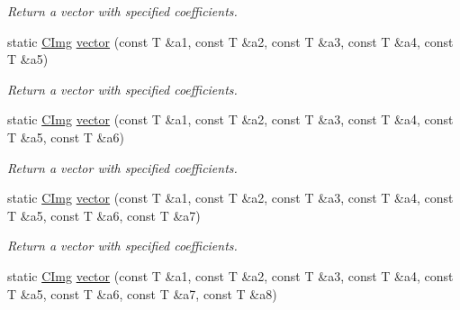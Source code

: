 \begin{DoxyCompactItemize}
\begin{DoxyCompactList}\small\item\em Return a vector with specified coefficients. \item\end{DoxyCompactList}\item 
\hypertarget{structcimg__library_1_1_c_img_a7c57e2bfa997e03cf87ac2e8a39e5534}{
static \hyperlink{structcimg__library_1_1_c_img}{CImg} \hyperlink{structcimg__library_1_1_c_img_a7c57e2bfa997e03cf87ac2e8a39e5534}{vector} (const T \&a1, const T \&a2, const T \&a3, const T \&a4, const T \&a5)}
\label{structcimg__library_1_1_c_img_a7c57e2bfa997e03cf87ac2e8a39e5534}

\begin{DoxyCompactList}\small\item\em Return a vector with specified coefficients. \item\end{DoxyCompactList}\item 
\hypertarget{structcimg__library_1_1_c_img_a18472c0200e352d112a9acf746cdbbf5}{
static \hyperlink{structcimg__library_1_1_c_img}{CImg} \hyperlink{structcimg__library_1_1_c_img_a18472c0200e352d112a9acf746cdbbf5}{vector} (const T \&a1, const T \&a2, const T \&a3, const T \&a4, const T \&a5, const T \&a6)}
\label{structcimg__library_1_1_c_img_a18472c0200e352d112a9acf746cdbbf5}

\begin{DoxyCompactList}\small\item\em Return a vector with specified coefficients. \item\end{DoxyCompactList}\item 
\hypertarget{structcimg__library_1_1_c_img_a8104cd331d7ee1f65e85dc12074a42fd}{
static \hyperlink{structcimg__library_1_1_c_img}{CImg} \hyperlink{structcimg__library_1_1_c_img_a8104cd331d7ee1f65e85dc12074a42fd}{vector} (const T \&a1, const T \&a2, const T \&a3, const T \&a4, const T \&a5, const T \&a6, const T \&a7)}
\label{structcimg__library_1_1_c_img_a8104cd331d7ee1f65e85dc12074a42fd}

\begin{DoxyCompactList}\small\item\em Return a vector with specified coefficients. \item\end{DoxyCompactList}\item 
\hypertarget{structcimg__library_1_1_c_img_a14c8f10464b8cf1f00394a1419c53e65}{
static \hyperlink{structcimg__library_1_1_c_img}{CImg} \hyperlink{structcimg__library_1_1_c_img_a14c8f10464b8cf1f00394a1419c53e65}{vector} (const T \&a1, const T \&a2, const T \&a3, const T \&a4, const T \&a5, const T \&a6, const T \&a7, const T \&a8)}
\label{structcimg__library_1_1_c_img_a14c8f10464b8cf1f00394a1419c53e65}


\end{DoxyCompactItemize}
